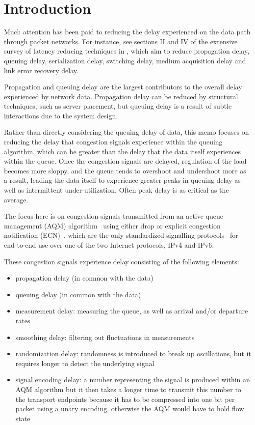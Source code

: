 \section{Introduction}\label{sigqdyntr_intro}

Much attention has been paid to reducing the delay experienced on the data path through packet networks. For instance, see sections II and IV of the extensive survey of latency reducing techniques in \cite{Briscoe14b:latency_survey}, which aim to reduce propagation delay, queuing delay, serialization delay, switching delay, medium acquisition delay and link error recovery delay.

Propagation and queuing delay are the largest contributors to the overall delay experienced by network data. Propagation delay can be reduced by structural techniques, such as server placement, but queuing delay is a result of subtle interactions due to the system design. 

Rather than directly considering the queuing delay of data, this memo focuses on reducing the delay that congestion signals experience within the queuing algorithm, which can be greater than the delay that the data itself experiences within the queue. Once the congestion signals are delayed, regulation of the load becomes more sloppy, and the queue tends to overshoot and undershoot more as a result, leading the data itself to experience greater peaks in queuing delay as well as intermittent under-utilization. Often peak delay is as critical as the average.

The focus here is on congestion signals transmitted from an active queue management (AQM) algorithm~\cite{Adams13:AQM_survey} using either drop or explicit congestion notification (ECN)~\cite{Floyd94:ECN}, which are the only standardized signalling protocols~\cite{IETF_RFC3168:ECN_IP_TCP} for end-to-end use over one of the two Internet protocols, IPv4 and IPv6.

These congestion signals experience delay consisting of the following elements:
\begin{itemize}[nosep]
	\item propagation delay (in common with the data)
	\item queuing delay (in common with the data)
	\item measurement delay: measuring the queue, as well as arrival and/or departure rates
	\item smoothing delay: filtering out fluctuations in measurements
	\item randomization delay: randomness is introduced to break up oscillations, but it requires longer to detect the underlying signal
	\item signal encoding delay: a number representing the signal is produced within an AQM algorithm but it then takes a longer time to transmit this number to the transport endpoints because it has to be compressed into one bit per packet using a unary encoding, otherwise the AQM would have to hold flow state
\end{itemize}

